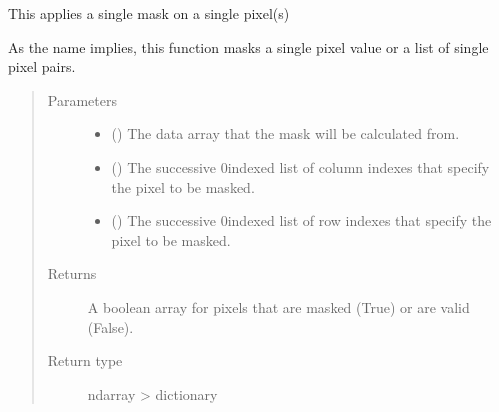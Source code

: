 \documentclass[letterpaper,10pt,english]{sphinxmanual}
\begin{document}
\begin{fulllineitems}
\label{\detokenize{docstrings/ifa_smeargle.masking.geometric:ifa_smeargle.masking.geometric.mask_single_pixels}}
This applies a single mask on a single pixel(s)

As the name implies, this function masks a single pixel value or
a list of single pixel pairs.
\begin{quote}\begin{description}
\item[{Parameters}] \leavevmode\begin{itemize}
\item {} 
 () \textendash{} The data array that the mask will be calculated from.

\item {} 
 () \textendash{} The successive 0\sphinxhyphen{}indexed list of column indexes that specify
the pixel to be masked.

\item {} 
 () \textendash{} The successive 0\sphinxhyphen{}indexed list of row indexes that specify the
pixel to be masked.

\end{itemize}

\item[{Returns}] \leavevmode
{} \textendash{} A boolean array for pixels that are masked (True) or are
valid (False).

\item[{Return type}] \leavevmode
ndarray \sphinxhyphen{}\textgreater{} dictionary

\end{description}\end{quote}

\end{fulllineitems}
\end{document}
